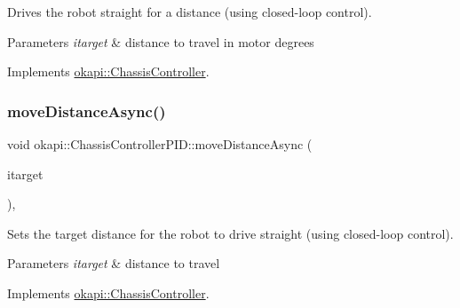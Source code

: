 Drives the robot straight for a distance (using closed-\/loop control).


\begin{DoxyCode}{0}
\DoxyCodeLine{\textcolor{comment}{// Spin the motors forward 400 degrees}}
\end{DoxyCode}



\begin{DoxyParams}{Parameters}
{\em itarget} & distance to travel in motor degrees \\
\hline
\end{DoxyParams}


Implements \mbox{\hyperlink{classokapi_1_1ChassisController_a58619e777fd1b3f8e1aae871d46a8ccf}{okapi\+::\+Chassis\+Controller}}.

\mbox{\label{classokapi_1_1ChassisControllerPID_affad4aa1b0bd54db728ac600493a6c4c}} 
\subsubsection{\texorpdfstring{moveDistanceAsync()}{moveDistanceAsync()}\hspace{0.1cm}{\footnotesize\ttfamily [1/2]}}
{\footnotesize\ttfamily void okapi\+::\+Chassis\+Controller\+P\+I\+D\+::move\+Distance\+Async (\begin{DoxyParamCaption}\item[{Q\+Length}]{itarget }\end{DoxyParamCaption})\hspace{0.3cm}{\ttfamily [override]}, {\ttfamily [virtual]}}

Sets the target distance for the robot to drive straight (using closed-\/loop control).


\begin{DoxyParams}{Parameters}
{\em itarget} & distance to travel \\
\hline
\end{DoxyParams}


Implements \mbox{\hyperlink{classokapi_1_1ChassisController_a67a17268b871a4f1ae74d67891cbf5dd}{okapi\+::\+Chassis\+Controller}}.

\mbox{\label{classokapi_1_1ChassisControllerPID_a7a13b5cd2fe7bce73cf0e3a3144fe6db}} 
